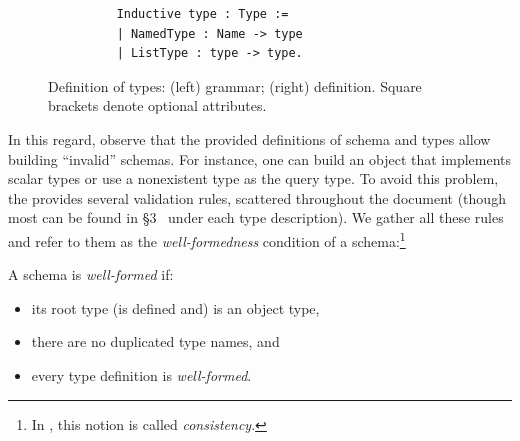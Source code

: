 \begin{figure}[h]
\begin{subfigure}{.5\textwidth}
\begin{verbatim}
    Inductive type : Type :=
    | NamedType : Name -> type
    | ListType : type -> type.
    \end{verbatim}

    \end{subfigure}
    \caption{Definition of \gql types: (left) \spec grammar; 
    (right) \gcoql definition.\newline
    {\footnotesize Square brackets denote optional attributes.}}
    \label{fig:types_def}
\end{figure}




In this regard, observe that the provided definitions of schema and types allow building ``invalid'' schemas. For instance, one can build an object that implements scalar types or use a nonexistent type as the query type. To avoid this problem, the \spec provides several validation rules, scattered throughout the document (though most can be found in \S3~\cite{gqlspec} under each type description).
 We gather all these rules and refer to them as the \textit{well-formedness}
condition of a \gql schema:\footnote{In \HP, this notion is called {\em consistency}.}

\begin{definition}
A \gql schema is \textit{well-formed} if: 
\begin{itemize}
    \item its root type (is defined and) is an object type, 
    \item there are no duplicated type names, and
    \item every type definition is \textit{well-formed}.
\end{itemize}
\end{definition}


